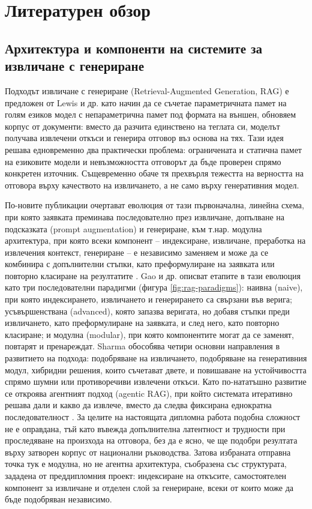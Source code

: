 \documentclass[12pt,a4paper]{article}
\let\origsection\section
\renewcommand{\section}{\clearpage\origsection}
\begin{document}
\section{Литературен обзор}

\subsection{Архитектура и компоненти на системите за извличане с генериране}
Подходът извличане с генериране (Retrieval-Augmented Generation, RAG) е предложен от Lewis и др. \cite{lewis2020rag} като начин да се съчетае параметричната памет на голям езиков модел с непараметрична памет под формата на външен, обновяем корпус от документи: вместо да разчита единствено на теглата си, моделът получава извлечени откъси и генерира отговор въз основа на тях. Тази идея решава едновременно два практически проблема: ограничената и статична памет на езиковите модели и невъзможността отговорът да бъде проверен спрямо конкретен източник. Същевременно обаче тя прехвърля тежестта на верността на отговора върху качеството на извличането, а не само върху генеративния модел.

По-новите публикации очертават еволюция от тази първоначална, линейна схема, при която заявката преминава последователно през извличане, допълване на подсказката (prompt augmentation) и генериране, към т.нар. модулна архитектура, при която всеки компонент -- индексиране, извличане, преработка на извлечения контекст, генериране -- е независимо заменяем и може да се комбинира с допълнителни стъпки, като преформулиране на заявката или повторно класиране на резултатите \cite{wu2024ragnlpsurvey}. Gao и др. \cite{gao2023ragsurvey} описват етапите в тази еволюция като три последователни парадигми (фигура \ref{fig:rag-paradigms}): наивна (naive), при която индексирането, извличането и генерирането са свързани във верига; усъвършенствана (advanced), която запазва веригата, но добавя стъпки преди извличането, като преформулиране на заявката, и след него, като повторно класиране; и модулна (modular), при която компонентите могат да се заменят, повтарят и пренареждат. Sharma \cite{sharma2025ragsurvey} обособява четири основни направления в развитието на подхода: подобряване на извличането, подобряване на генеративния модул, хибридни решения, които съчетават двете, и повишаване на устойчивостта спрямо шумни или противоречиви извлечени откъси. Като по-нататъшно развитие се откроява агентният подход (agentic RAG), при който системата итеративно решава дали и какво да извлече, вместо да следва фиксирана еднократна последователност \cite{singh2025agenticrag}. За целите на настоящата дипломна работа подобна сложност не е оправдана, тъй като въвежда допълнителна латентност и трудности при проследяване на произхода на отговора, без да е ясно, че ще подобри резултата върху затворен корпус от национални ръководства. Затова избраната отправна точка тук е модулна, но не агентна архитектура, съобразена със структурата, зададена от преддипломния проект: индексиране на откъсите, самостоятелен компонент за извличане и отделен слой за генериране, всеки от които може да бъде подобряван независимо.
\end{document}
